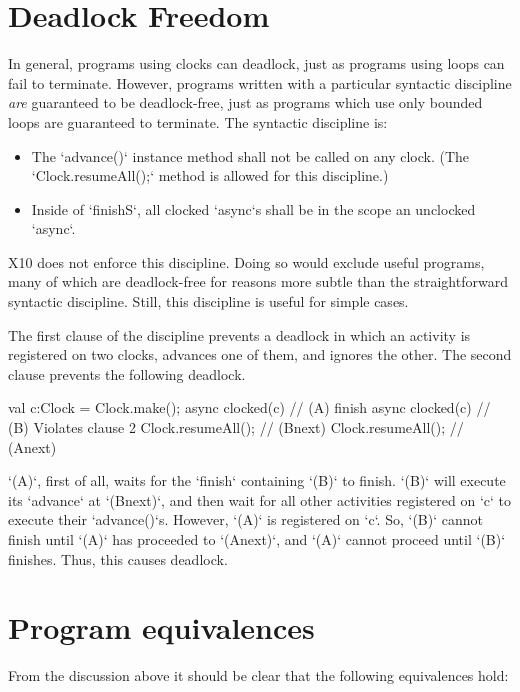 \section{Deadlock Freedom}

In general, programs using clocks can deadlock, just as programs using loops
can fail to terminate.  However, programs written with a particular syntactic
discipline {\em are} guaranteed to be deadlock-free, just as programs which
use only bounded loops are guaranteed to terminate.  The syntactic discipline
is: 
\begin{itemize}
\item The \xcd`advance()` {instance method} shall not be called on any clock.
      (The 
      \xcd`Clock.resumeAll();` method is allowed for this discipline.)
\item Inside of \xcd`finish{S}`, all clocked \xcd`async`s shall be in the scope
      an unclocked \xcd`async`.  
\end{itemize}
X10 does not enforce this discipline.  Doing so would exclude useful programs,
many of which are deadlock-free for reasons more subtle than the
straightforward syntactic discipline.  Still, this discipline is useful for
simple cases. 

The first clause of the discipline prevents a deadlock in which an activity
is registered on two clocks, advances one of them, and ignores the other. 
The second clause prevents the following deadlock.  
\begin{xten}
val c:Clock = Clock.make();
async clocked(c) {                // (A) 
      finish async clocked(c) {   // (B) Violates clause 2
            Clock.resumeAll();   // (Bnext)
      }
      Clock.resumeAll();         // (Anext)
}
\end{xten}
\xcd`(A)`, first of all, waits for the \xcd`finish` containing \xcd`(B)` to
finish.  
\xcd`(B)` will execute its \xcd`advance` at \xcd`(Bnext)`, and then wait for all
other activities registered on \xcd`c` to execute their \xcd`advance()`s.
However, \xcd`(A)` is registered on \xcd`c`.  So, \xcd`(B)` cannot finish
until \xcd`(A)` has proceeded to \xcd`(Anext)`, and \xcd`(A)` cannot proceed
until \xcd`(B)` finishes. Thus, this causes deadlock.


\section{Program equivalences}
From the discussion above it should be clear that the following
equivalences hold:

